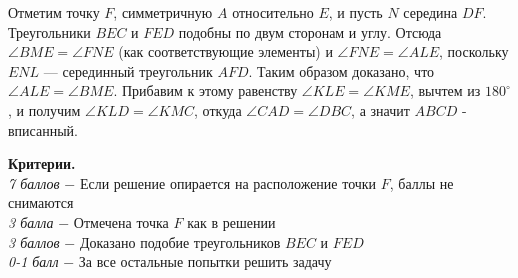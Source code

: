 Отметим точку $F$, симметричную $A$ относительно $E$, и пусть $N$ середина $D F$. Треугольники $B E C$ и $F E D$ подобны по двум сторонам и углу. Отсюда $\angle B M E=\angle F N E$ (как соответствующие элементы) и $\angle F N E=\angle A L E$, поскольку $E N L$ — серединный треугольник $A F D$. Таким образом доказано, что $\angle A L E=\angle B M E$. Прибавим к этому равенству $\angle K L E=\angle K M E$, вычтем из $180^{\circ}$, и получим $\angle K L D=\angle K M C$, откуда $\angle C A D=\angle D B C$, а значит $A B C D$ - вписанный.

\textbf{Критерии.} \\
\textit{7 баллов} $-$ Если решение опирается на расположение точки $F$, баллы не снимаются\\
\textit{3 балла} $-$ Отмечена точка $F$ как в решении\\
\textit{3 баллов} $-$ Доказано подобие треугольников $BEC$ и $FED$\\
\textit{0-1 балл} $-$ За все остальные попытки решить задачу\\


